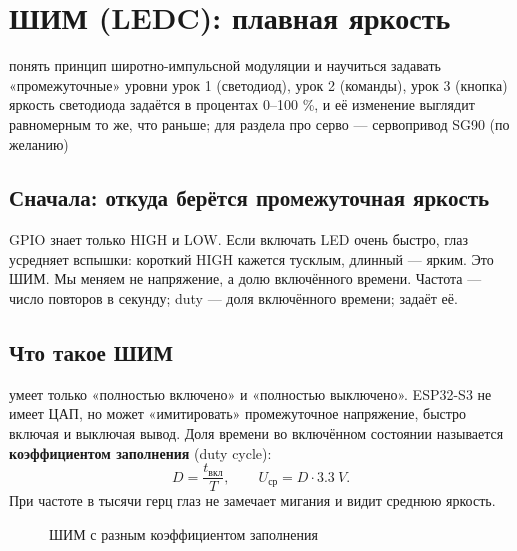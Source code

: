 \section{ШИМ (LEDC): плавная яркость}\label{les:pwm}
\lessonintro
  {понять принцип широтно-импульсной модуляции и научиться задавать «промежуточные» уровни}
  {урок 1 (светодиод), урок 2 (команды), урок 3 (кнопка)}
  {яркость светодиода задаётся в процентах 0--100 \%, и её изменение выглядит равномерным}
  {то же, что раньше; для раздела про серво --- сервопривод SG90 (по желанию)}

\subsection{Сначала: откуда берётся промежуточная яркость}

GPIO знает только HIGH и LOW. Если включать LED очень быстро, глаз усредняет вспышки: короткий HIGH
кажется тусклым, длинный --- ярким. Это ШИМ. Мы меняем не напряжение, а долю включённого времени.
Частота --- число повторов в секунду; duty --- доля включённого времени;  задаёт её.

\subsection{Что такое ШИМ}

 умеет только «полностью включено» и «полностью выключено». ESP32-S3 не имеет ЦАП,
но может «имитировать» промежуточное напряжение, быстро включая и выключая вывод.
Доля времени во включённом состоянии называется \textbf{коэффициентом заполнения} (duty cycle):
\[
  D = \frac{t_\text{вкл}}{T}, \qquad U_\text{ср} = D \cdot \SI{3.3}{V}.
\]
При частоте в тысячи герц глаз не замечает мигания и видит среднюю яркость.

\begin{figure}[H]
\centering
{}
\caption{ШИМ с разным коэффициентом заполнения}
\end{figure}

